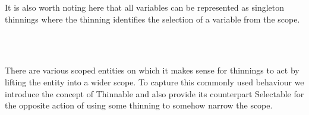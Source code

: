 It is also worth noting here that all variables can be represented as
singleton thinnings where the thinning identifies the selection of a
variable from the scope.

\begin{code}%
\>[0]\AgdaSpace{}%
\AgdaSymbol{:}\AgdaSpace{}%
\AgdaSpace{}%
\AgdaSpace{}%
\AgdaSpace{}%
\AgdaSpace{}%
\AgdaSpace{}%
\<%
\\
\>[0]\AgdaSpace{}%
\AgdaSymbol{\{}\AgdaSpace{}%
\AgdaSymbol{\}}\AgdaSpace{}%
%
\>[22]\AgdaSymbol{=}\AgdaSpace{}%
\AgdaSpace{}%
\<%
\\
\>[0]\AgdaSpace{}%
\AgdaSymbol{\{}\AgdaSpace{}%
\AgdaSymbol{\}}\AgdaSpace{}%
\AgdaSymbol{(}\AgdaSpace{}%
\AgdaSymbol{)}\AgdaSpace{}%
\AgdaSymbol{=}\AgdaSpace{}%
\AgdaSpace{}%
\AgdaSpace{}%
\AgdaSpace{}%
\<%
\end{code}

There are various scoped entities on which it makes sense for thinnings
to act by lifting the entity into a wider scope. To capture this commonly
used behaviour we introduce the concept of Thinnable and also provide its
counterpart Selectable for the opposite action of using some thinning to
somehow narrow the scope.

